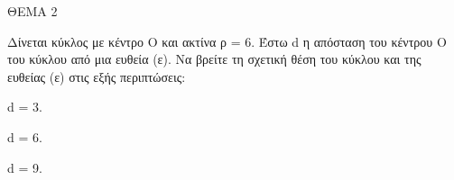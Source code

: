 
ΘΕΜΑ 2

Δίνεται κύκλος με κέντρο Ο και ακτίνα ρ = 6. Έστω d η απόσταση του κέντρου Ο του κύκλου από μια ευθεία (ε). Να βρείτε τη σχετική θέση του κύκλου και της ευθείας (ε) στις εξής περιπτώσεις:

\begin{alist}
\item d = 3. 

\item d = 6. 

\item d = 9. 
\end{alist}
